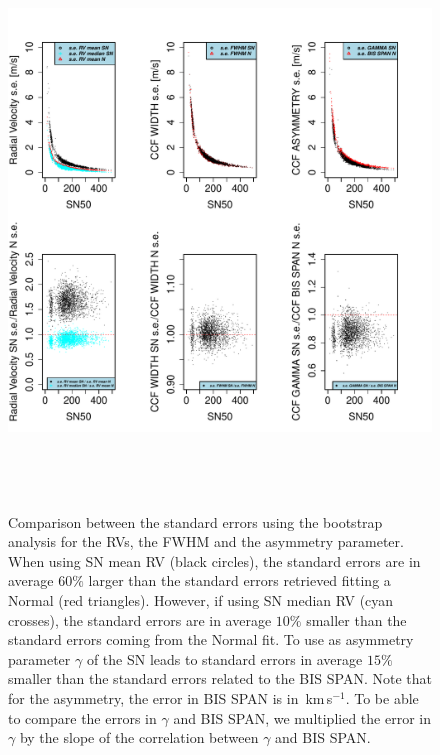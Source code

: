 \documentclass[11pt, oneside]{article}
\def\kms{\hbox{\,km\,s$^{-1}$}}       %
\begin{document}
%
\begin{figure}[htbp]
   \centering
\includegraphics[height = 6in]{[5]Errors_vs_SNR_all_stars.pdf} 
   \caption{Comparison between the standard errors using the bootstrap analysis for the RVs, the FWHM and the asymmetry parameter. When using SN mean RV (black circles), the standard errors are in average $60\%$ larger than the standard errors retrieved fitting a Normal (red triangles). However, if using SN median RV (cyan crosses), the standard errors are in average $10\%$ smaller than the standard errors coming from the Normal fit. To use as asymmetry parameter $\gamma$ of the SN leads to standard errors in average $15\%$ smaller than the standard errors related to the BIS SPAN. Note that for the asymmetry, the error in BIS SPAN is in \kms. To be able to compare the errors in $\gamma$ and BIS SPAN, we multiplied the error in $\gamma$ by the slope of the correlation between $\gamma$ and BIS SPAN.}
   \label{fig:se}
\end{figure}
\end{document}

